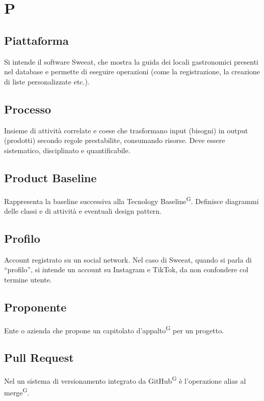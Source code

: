 \section{P}

\subsection{Piattaforma} Si intende il software Sweeat, che mostra la guida dei locali gastronomici presenti nel database e permette di eseguire operazioni (come la registrazione, la creazione di liste personalizzate etc.).

\subsection{Processo}
Insieme di attività correlate e coese che trasformano input (bisogni) in output (prodotti) secondo regole prestabilite, consumando risorse. Deve essere sistematico, disciplinato e quantificabile.

\subsection{Product Baseline}
Rappresenta la baseline successiva alla Tecnology Baseline\textsuperscript{G}. Definisce diagrammi delle classi e di attività e eventuali design pattern. 

\subsection{Profilo} Account registrato su un social network. Nel caso di Sweeat, quando si parla di “profilo”, si intende un account su Instagram e TikTok, da non confondere col termine utente.




\subsection{Proponente}
Ente o azienda che propone un capitolato d’appalto\textsuperscript{G} per un progetto.

\subsection{Pull Request}
Nel un sistema di versionamento integrato da GitHub\textsuperscript{G} è l'operazione alias al merge\textsuperscript{G}.

\clearpage